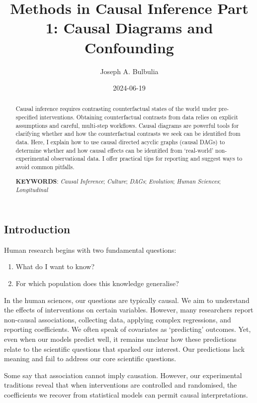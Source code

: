 \documentclass[
  single column]{article}
\title{Methods in Causal Inference Part 1: Causal Diagrams and
Confounding}
\author{Joseph A. Bulbulia}
\affil{%
             \small{     Victoria University of Wellington, New Zealand
          ORCID \textcolor[HTML]{A6CE39}{\aiOrcid} ~0000-0002-5861-2056 }
              }
\date{2024-06-19}
\providecommand{\tightlist}{%
  \setlength{\itemsep}{0pt}\setlength{\parskip}{0pt}}\usepackage{longtable,booktabs,array}
\begin{document}
\maketitle
\begin{abstract}
Causal inference requires contrasting counterfactual states of the world
under pre-specified interventions. Obtaining counterfactual contrasts
from data relies on explicit assumptions and careful, multi-step
workflows. Causal diagrams are powerful tools for clarifying whether and
how the counterfactual contrasts we seek can be identified from data.
Here, I explain how to use causal directed acyclic graphs (causal DAGs)
to determine whether and how causal effects can be identified from
`real-world' non-experimental observational data. I offer practical tips
for reporting and suggest ways to avoid common pitfalls.

\textbf{KEYWORDS}: \emph{Causal Inference}; \emph{Culture}; \emph{DAGs};
\emph{Evolution}; \emph{Human Sciences}; \emph{Longitudinal}
\end{abstract}

\subsection{Introduction}\label{id-sec-introduction}

Human research begins with two fundamental questions:

\begin{enumerate}
\def\labelenumi{\arabic{enumi}.}
\tightlist
\item
  What do I want to know?
\item
  For which population does this knowledge generalise?
\end{enumerate}

In the human sciences, our questions are typically causal. We aim to
understand the effects of interventions on certain variables. However,
many researchers report non-causal associations, collecting data,
applying complex regressions, and reporting coefficients. We often speak
of covariates as `predicting' outcomes. Yet, even when our models
predict well, it remains unclear how these predictions relate to the
scientific questions that sparked our interest. Our predictions lack
meaning and fail to address our core scientific questions.

Some say that association cannot imply causation. However, our
experimental traditions reveal that when interventions are controlled
and randomised, the coefficients we recover from statistical models can
permit causal interpretations.
\end{document}
